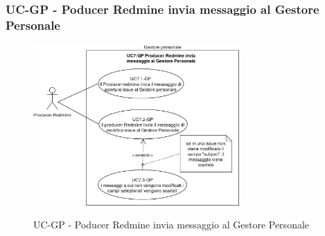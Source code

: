\subsubsection{UC\theuccount-GP - Poducer Redmine invia messaggio al Gestore Personale}
    \begin{figure}[H]
		\centering
		\includegraphics[width=0.7\textwidth]{img/casi_d'uso/UC7.png}\\
		\caption{UC\theuccount-GP - Poducer Redmine invia messaggio al Gestore Personale}
	\end{figure}
